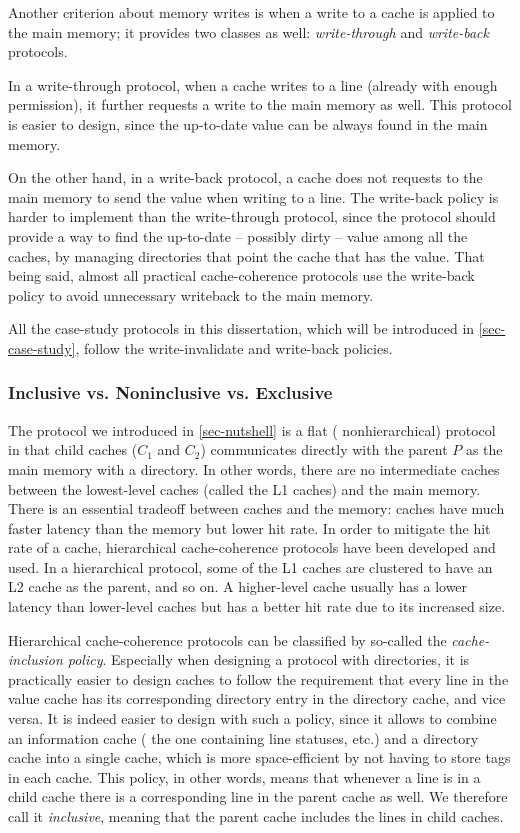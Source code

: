 Another criterion about memory writes is when a write to a cache is applied to the main memory; it provides two classes as well: \emph{write-through} and \emph{write-back} protocols.

In a write-through protocol, when a cache writes to a line (already with enough permission), it further requests a write to the main memory as well.
This protocol is easier to design, since the up-to-date value can be always found in the main memory.

On the other hand, in a write-back protocol, a cache does not requests to the main memory to send the value when writing to a line.
The write-back policy is harder to implement than the write-through protocol, since the protocol should provide a way to find the up-to-date -- possibly dirty -- value among all the caches, \eg{} by managing directories that point the cache that has the value.
That being said, almost all practical cache-coherence protocols use the write-back policy to avoid unnecessary writeback to the main memory.

All the case-study protocols in this dissertation, which will be introduced in \autoref{sec-case-study}, follow the write-invalidate and write-back policies.

\subsubsection{Inclusive vs. Noninclusive vs. Exclusive}

The protocol we introduced in \autoref{sec-nutshell} is a flat (\ie{} nonhierarchical) protocol in that child caches ($C_1$ and $C_2$) communicates directly with the parent $P$ as the main memory with a directory.
In other words, there are no intermediate caches between the lowest-level caches (called the L1 caches) and the main memory.
There is an essential tradeoff between caches and the memory: caches have much faster latency than the memory but lower hit rate.
In order to mitigate the hit rate of a cache, hierarchical cache-coherence protocols have been developed and used.
In a hierarchical protocol, some of the L1 caches are clustered to have an L2 cache as the parent, and so on.
A higher-level cache usually has a lower latency than lower-level caches but has a better hit rate due to its increased size.

Hierarchical cache-coherence protocols can be classified by so-called the \emph{cache-inclusion policy}.
Especially when designing a protocol with directories, it is practically easier to design caches to follow the requirement that every line in the value cache has its corresponding directory entry in the directory cache, and vice versa.
It is indeed easier to design with such a policy, since it allows to combine an information cache (\ie{} the one containing line statuses, etc.) and a directory cache into a single cache, which is more space-efficient by not having to store tags in each cache.
This policy, in other words, means that whenever a line is in a child cache there is a corresponding line in the parent cache as well.
We therefore call it \emph{inclusive}, meaning that the parent cache includes the lines in child caches.

